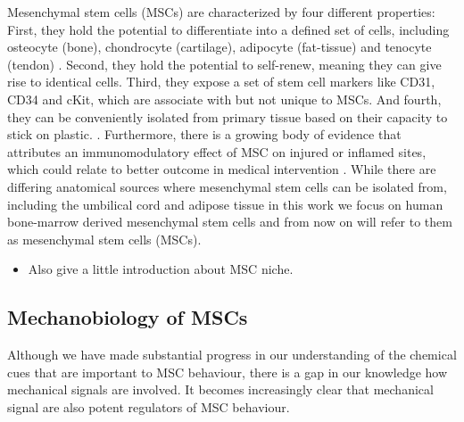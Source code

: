 Mesenchymal stem cells (MSCs) are characterized by four different properties: First, they hold the potential to differentiate into a defined set of cells, including osteocyte (bone), chondrocyte (cartilage), adipocyte (fat-tissue) and tenocyte (tendon) \cite{Ng2008}. Second, they hold the potential to self-renew, meaning they can give rise to identical cells. Third, they expose a set of stem cell markers like CD31, CD34 and cKit, which are associate with but not unique to MSCs. \cite{Battula2009} And fourth, they can be conveniently isolated from primary tissue based on their capacity to stick on plastic. \cite{Buhring2007}. Furthermore, there is a growing body of evidence that attributes an immunomodulatory effect of MSC on injured or inflamed sites, which could relate to better outcome in medical intervention \cite{Caplan2011, Hass2011}.
While there are differing anatomical sources where mesenchymal stem cells can be isolated from, including the umbilical cord and adipose tissue \cite{Barlow2008, Hass2011} in this work we focus on human bone-marrow derived mesenchymal stem cells and from now on will refer to them as mesenchymal stem cells (MSCs).

\begin{itemize}
	\item Also give a little introduction about MSC niche. 
\end{itemize}

\subsection{Mechanobiology of MSCs}

Although we have made substantial progress in our understanding of the chemical cues that are important to MSC behaviour, there is a gap in our knowledge how mechanical signals are involved. It becomes increasingly clear that mechanical signal are also potent regulators of MSC behaviour. 

